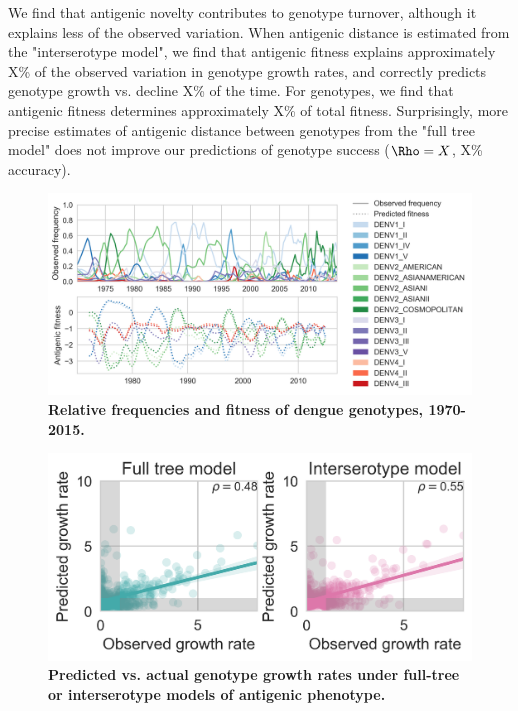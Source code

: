\documentclass[11pt,oneside,letterpaper]{article}
\begin{document}
We find that antigenic novelty contributes to genotype turnover, although it explains less of the observed variation.
When antigenic distance is estimated from the "interserotype model", we find that antigenic fitness explains approximately X\% of the observed variation in genotype growth rates, and correctly predicts genotype growth vs. decline X\% of the time.
For genotypes, we find that antigenic fitness determines approximately X\% of total fitness.
Surprisingly, more precise estimates of antigenic distance between genotypes from the "full tree model" does not improve our predictions of genotype success ($\Rho = X$, X\% accuracy).

\begin{figure}[h]
  \begin{centering}
\includegraphics[width=\linewidth]{../figures/png/genotype_fitness.png}
    \caption{\textbf{Relative frequencies and fitness of dengue genotypes, 1970-2015.}}
     \label{genotype_fitness}
   \end{centering}
\end{figure}

\begin{figure}[h]
\centering
\includegraphics[width=0.7\linewidth]{../figures/png/genotype_fitness_model_compare.png}
\begin{centering}
    \caption{\textbf{Predicted vs. actual genotype growth rates under full-tree or interserotype models of antigenic phenotype.}}
     \label{genotype_growth_rates}
\end{centering}
\end{figure}
\end{document}
